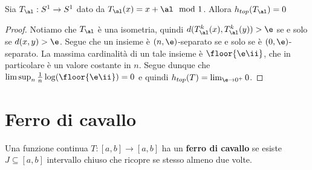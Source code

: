 \begin{proposition}
Sia $T_\al:S^1\to S^1$ dato da $T_\al(x)=x+\al\mod 1$. Allora $h_{top}(T_\al)=0$
\end{proposition}
\begin{proof}
Notiamo che $T_\al$ \`e una isometria, quindi $d(T_\al^k(x),T^k_\al(y))>\e$ se e solo se $d(x,y)>\e$. Segue che un insieme \`e $(n,\e)$-separato se e solo se \`e $(0,\e)$-separato. La massima cardinalit\`a di un tale insieme \`e $\floor{\e\ii}$, che in particolare \`e un valore costante in $n$. Segue dunque che $\limsup_n\frac1n\log(\floor{\e\ii})=0$ e quindi $h_{top}(T)=\lim_{\e\to0^+}0$.
\end{proof}

\section{Ferro di cavallo}
\begin{definition}
Una funzione continua $T:[a,b]\to[a,b]$ ha un \textbf{ferro di cavallo} se esiste $J\subseteq [a,b]$ intervallo chiuso che ricopre se stesso almeno due volte.
\end{definition}

